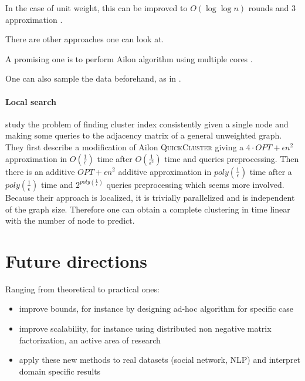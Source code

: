 In the case of unit weight, this can be improved to $O(\log\log n)$ rounds
and $3$ approximation \autocite{Ahn2015}.

There are other approaches \autocite[Part III]{bonchi2014correlation} one can
look at.

A promising one is to perform Ailon algorithm using multiple cores
\autocite{Pan2014}.

One can also sample the data beforehand, as in \autocite{Bertolacci07}.

\paragraph{Local search}
\Textcite{Bonchi2013} study the problem of finding cluster index consistently
given a single node and making some queries to the adjacency matrix of a
general unweighted graph. They first describe a modification of Ailon
\textsc{QuickCluster} giving a $4\cdot OPT + \epsilon n^2$ approximation in
$O(\frac{1}{\epsilon})$ time after $O(\frac{1}{\epsilon^2})$ time and queries
preprocessing. Then there is an additive $OPT + \epsilon n^2$ additive
approximation in $poly(\frac{1}{\epsilon})$ time after a
$poly(\frac{1}{\epsilon})$ time and $2^{poly(\frac{1}{\epsilon})}$ queries
preprocessing which seems more involved.  Because their approach is localized,
it is trivially parallelized and is independent of the graph size. Therefore
one can obtain a complete clustering in time linear with the number of node to
predict.
\section{Future directions}
Ranging from theoretical to practical ones:

\begin{itemize}
	\item improve bounds, for instance by designing ad-hoc algorithm for
		specific case
	\item improve scalability, for instance using distributed non negative
		matrix factorization, an active area of research
		\autocite{Bhojanapalli2014,Hastie2014,Udell2014}
	\item apply these new methods to real datasets (social network, NLP) and
		interpret domain specific results
\end{itemize}

